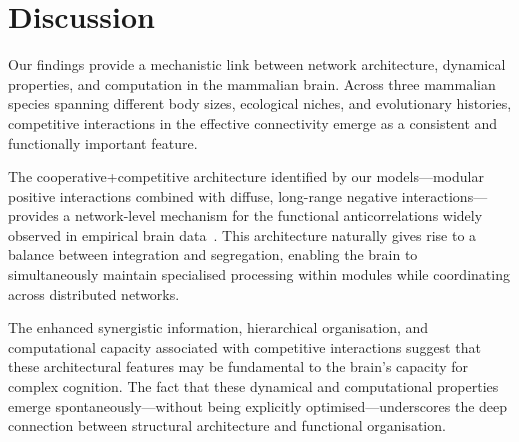 \documentclass[11pt]{article}
\begin{document}
\section{Discussion}

Our findings provide a mechanistic link between network architecture, dynamical properties, and computation in the mammalian brain. Across three mammalian species spanning different body sizes, ecological niches, and evolutionary histories, competitive interactions in the effective connectivity emerge as a consistent and functionally important feature.

The cooperative+competitive architecture identified by our models---modular positive interactions combined with diffuse, long-range negative interactions---provides a network-level mechanism for the functional anticorrelations widely observed in empirical brain data~\citep{fox2005human}. This architecture naturally gives rise to a balance between integration and segregation, enabling the brain to simultaneously maintain specialised processing within modules while coordinating across distributed networks.

The enhanced synergistic information, hierarchical organisation, and computational capacity associated with competitive interactions suggest that these architectural features may be fundamental to the brain's capacity for complex cognition. The fact that these dynamical and computational properties emerge spontaneously---without being explicitly optimised---underscores the deep connection between structural architecture and functional organisation.



\end{document}
